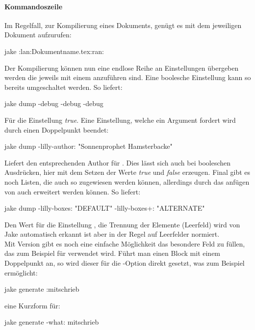 \paragraph{Kommandoszeile}
Im Regelfall, zur Kompilierung eines Dokuments, genügt es \Jake mit dem jeweiligen Dokument aufzurufen:
\begin{bash*}
jake :lan:Dokumentname.tex:ran:
\end{bash*}
Der Kompilierung können nun eine endlose Reihe an Einstellungen übergeben werden die jeweils mit einem \say{\T{-}} anzuführen sind. Eine boolesche Einstellung kann so bereits umgeschaltet werden. So liefert:
\begin{bash*}
jake dump -debug -debug -debug
\end{bash*}
Für die Einstellung  \emph{true}. Eine  Einstellung, welche ein Argument fordert wird durch einen Doppelpunkt beendet:
\begin{bash*}
jake dump -lilly-author: "Sonnenprophet Hamsterbacke"
\end{bash*}
Liefert den entsprechenden Author für . Dies lässt sich auch bei booleschen Ausdrücken, hier mit dem Setzen der Werte \emph{true} und \emph{false} erzeugen. Final gibt es noch Listen, die auch so zugewiesen werden können, allerdings durch das anfügen von \T{+:} auch erweitert werden können. So liefert:
\begin{bash*}
jake dump -lilly-boxes: "DEFAULT" -lilly-boxes+: "ALTERNATE"
\end{bash*}
Den Wert  für die Einstellung , die Trennung der Elemente (Leerfeld) wird von Jake automatisch erkannt ist aber in der Regel auf Leerfelder normiert.\\
Mit Version  gibt es noch eine einfache Möglichkeit das besondere Feld  zu füllen, das zum Beispiel für  verwendet wird.
Führt man einen Block mit einem Doppelpunkt an, so wird dieser für die -Option direkt gesetzt, was zum Beispiel ermöglicht:
\begin{bash*}
jake generate :mitschrieb
\end{bash*}
eine Kurzform für:
\begin{bash*}
jake generate -what: mitschrieb
\end{bash*}
